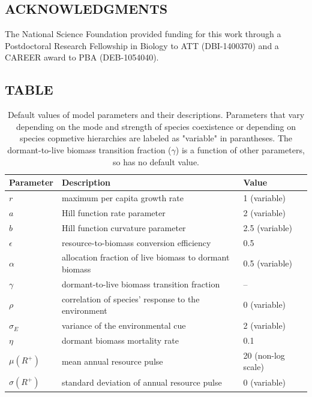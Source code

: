\documentclass[12pt,]{article}
\begin{document}
\subsection{ACKNOWLEDGMENTS}\label{acknowledgments}

The National Science Foundation provided funding for this work through a
Postdoctoral Research Fellowship in Biology to ATT (DBI-1400370) and a
CAREER award to PBA (DEB-1054040).

\newpage{}

\subsection{TABLE}\label{table}

\begin{table}[!htbp]
\footnotesize
\caption{Default values of model parameters and their descriptions. Parameters that vary depending on the mode and strength of species coexistence or depending on species copmetive hierarchies are labeled as "variable" in parantheses. The dormant-to-live biomass transition fraction ($\gamma$) is a function of other parameters, so has no default value.}
\begin{tabular}{l l l}
\hline
Parameter & Description & Value \\
\hline
$r$ & maximum per capita growth rate & 1 (variable) \\
$a$ & Hill function rate parameter & 2 (variable) \\
$b$ & Hill function curvature parameter & 2.5 (variable) \\
$\epsilon$ & resource-to-biomass conversion efficiency & 0.5 \\
$\alpha$ & allocation fraction of live biomass to dormant biomass & 0.5 (variable) \\
$\gamma$ & dormant-to-live biomass transition fraction & -- \\
$\rho$ & correlation of species' response to the environment & 0 (variable) \\
$\sigma_E$ & variance of the environmental cue & 2 (variable) \\
$\eta$ & dormant biomass mortality rate & 0.1 \\
$\mu(R^+)$ & mean annual resource pulse & 20 (non-log scale) \\
$\sigma(R^+)$ & standard deviation of annual resource pulse & 0 (variable) \\
\hline
\end{tabular}
\end{table}
\end{document}
